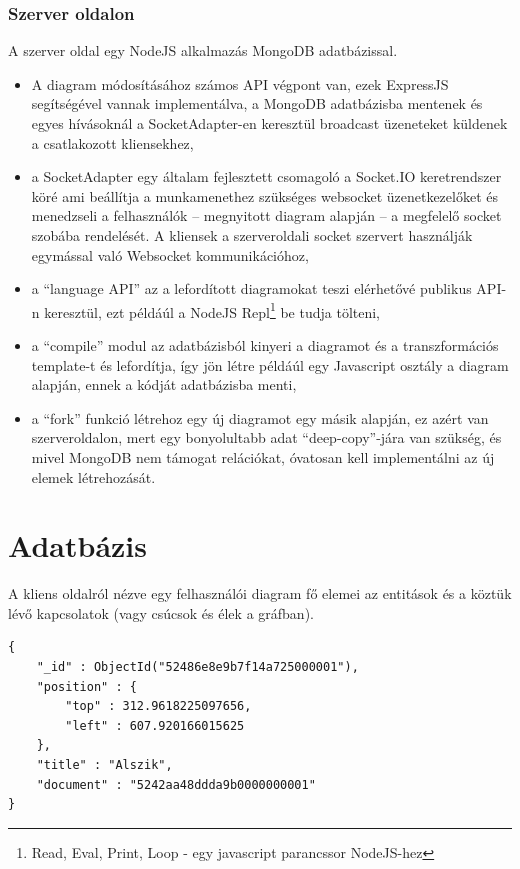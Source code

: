 \subsubsection{Szerver oldalon}

A szerver oldal egy NodeJS alkalmazás MongoDB adatbázissal.   

\begin{itemize}
\item A diagram módosításához számos API végpont van, ezek ExpressJS segítségével vannak implementálva, a MongoDB adatbázisba mentenek és egyes hívásoknál a SocketAdapter-en keresztül broadcast üzeneteket küldenek a csatlakozott kliensekhez,
\item a SocketAdapter egy általam fejlesztett csomagoló a Socket.IO keretrendszer köré ami beállítja a munkamenethez szükséges websocket üzenetkezelőket és menedzseli a felhasználók -- megnyitott diagram alapján -- a megfelelő socket szobába rendelését. A kliensek a szerveroldali socket szervert használják egymással való Websocket kommunikációhoz, 
\item a ``language API'' az a lefordított diagramokat teszi elérhetővé publikus API-n keresztül, ezt példáúl a NodeJS Repl\footnote{Read, Eval, Print, Loop - egy javascript parancssor NodeJS-hez} be tudja tölteni,
\item a ``compile'' modul az adatbázisból kinyeri a diagramot és a transzformációs template-t és lefordítja, így jön létre példáúl egy Javascript osztály a diagram alapján, ennek a kódját adatbázisba menti, 
\item a ``fork'' funkció létrehoz egy új diagramot egy másik alapján, ez azért van szerveroldalon, mert egy bonyolultabb adat ``deep-copy''-jára van szükség, és mivel MongoDB nem támogat relációkat, óvatosan kell implementálni az új elemek létrehozását.
\end{itemize}

\section{Adatbázis}

A kliens oldalról nézve egy felhasználói diagram fő elemei az entitások és a köztük lévő kapcsolatok (vagy csúcsok és élek a gráfban). 


\begin{lstlisting}[label=entity,caption=Egy gráf csúcs -- vagy entitás -- reprezentálása az adatbázisban]
{
    "_id" : ObjectId("52486e8e9b7f14a725000001"),
    "position" : {
        "top" : 312.9618225097656,
        "left" : 607.920166015625
    },
    "title" : "Alszik",
    "document" : "5242aa48ddda9b0000000001"
}
\end{lstlisting}

